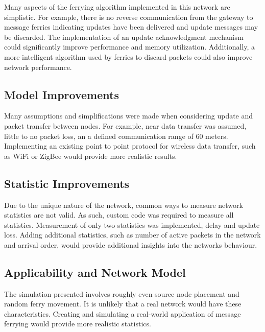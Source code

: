 Many aspects of the ferrying algorithm implemented in this network are simplistic.
For example, there is no reverse communication from the gateway to message ferries indicating updates have been delivered and update messages may be discarded.
The implementation of an update acknowledgment mechanism could significantly improve performance and memory utilization.
Additionally, a more intelligent algorithm used by ferries to discard packets could also improve network performance.

\subsection{Model Improvements}

Many assumptions and simplifications were made when considering update and packet transfer between nodes.
For example, near data transfer was assumed, little to no packet loss, an a defined communication range of 60 meters.
Implementing an existing point to point protocol for wireless data transfer, such as WiFi or ZigBee would provide more realistic results.

\subsection{Statistic Improvements}

Due to the unique nature of the network, common ways to measure network statistics are not valid.
As such, custom code was required to measure all statistics.
Measurement of only two statistics was implemented, delay and update loss.
Adding additional statistics, such as number of active packets in the network and arrival order, would provide additional insights into the networks behaviour.

\subsection{Applicability and Network Model}

The simulation presented involves roughly even source node placement and random ferry movement.
It is unlikely that a real %
network would have these characteristics.
Creating and simulating a real-world application of message ferrying would provide more realistic statistics.


